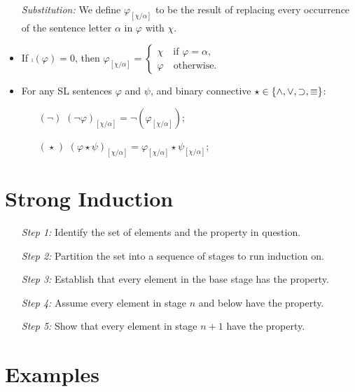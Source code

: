 \documentclass[a4paper, 11pt]{article} %
\begin{document}
\begin{itemize}
\begin{itemize}
    \end{itemize}
  \item[\it Substitution:] We define $\varphi_{[\chi/\alpha]}$ to be the result of replacing every occurrence of the sentence letter $\alpha$ in $\varphi$ with $\chi$.
      \item If $\comp(\varphi)=0$, then $\varphi_{[\chi/\alpha]}=
        \begin{cases}
          \chi \quad\text{if } \varphi=\alpha,\\
          \varphi \quad\text{otherwise.}
        \end{cases}$
      \item For any SL sentences $\varphi$ and $\psi$, and binary connective $\star\in\lbrace\wedge,\vee,\supset,\equiv\rbrace$: 
    \begin{itemize}
      \item[$(\neg)$] $(\neg\varphi)_{[\chi/\alpha]}=\neg(\varphi_{[\chi/\alpha]})$;
      \item[$(\hspace{1pt}\star\hspace{1pt})$] $(\varphi\star\psi)_{[\chi/\alpha]}=\varphi_{[\chi/\alpha]}\star\psi_{[\chi/\alpha]}$;
    \end{itemize}
\end{itemize}





\section*{Strong Induction}

\begin{enumerate}
  \item[\it Step 1:] Identify the set of elements and the property in question.
  \item[\it Step 2:] Partition the set into a sequence of stages to run induction on.
  \item[\it Step 3:] Establish that every element in the base stage has the property.
  \item[\it Step 4:] Assume every element in stage $n$ and below have the property. 
  \item[\it Step 5:] Show that every element in stage $n+1$ have the property. 
\end{enumerate}





\section*{Examples}
\end{document}
